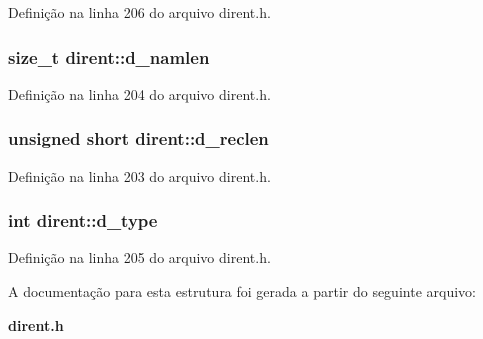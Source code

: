 Definição na linha 206 do arquivo dirent.\+h.

\subsubsection[{d\+\_\+namlen}]{\setlength{\rightskip}{0pt plus 5cm}size\+\_\+t dirent\+::d\+\_\+namlen}\label{structdirent_a09ced068b03cdb339e34840c8b709621}


Definição na linha 204 do arquivo dirent.\+h.

\subsubsection[{d\+\_\+reclen}]{\setlength{\rightskip}{0pt plus 5cm}unsigned short dirent\+::d\+\_\+reclen}\label{structdirent_a90dc47836e8ef510437317876368859e}


Definição na linha 203 do arquivo dirent.\+h.

\subsubsection[{d\+\_\+type}]{\setlength{\rightskip}{0pt plus 5cm}int dirent\+::d\+\_\+type}\label{structdirent_ad6a736cb04c7295e8f97f708324b3500}


Definição na linha 205 do arquivo dirent.\+h.



A documentação para esta estrutura foi gerada a partir do seguinte arquivo\+:\begin{DoxyCompactItemize}
\item 
{\bf dirent.\+h}\end{DoxyCompactItemize}
